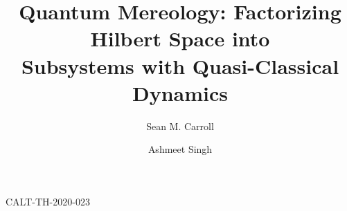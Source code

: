 \documentclass[aps,pra,onecolumn,nofootinbib,notitlepage,11pt,tightenlines]{revtex4-1}
\begin{document}
\baselineskip=14pt
\hfill CALT-TH-2020-023
\hfill

\vspace{0.5cm}
\thispagestyle{empty}



\title{Quantum Mereology: Factorizing Hilbert Space into \\ Subsystems with Quasi-Classical Dynamics}
\author{Sean M. Carroll}
\author{Ashmeet Singh}

\newcommand{\be}{\begin{equation}}
\newcommand{\ee}{\end{equation}}
\newcommand{\bea}{\begin{eqnarray}}
\newcommand{\eea}{\end{eqnarray}}
\newcommand{\hst}{\widetilde{\mathcal{H}}} 
\newcommand{\iso}{\dot{=}}
\newcommand{\tdec}{{\{\theta\}}}
\newcommand{\pdec}{{\{\phi\}}}
\newcommand{\spsi}{\ket{\psi}}
\newcommand{\psimu}{\ket{\psi^{(\mu)}}}
\newcommand{\Cmu}{\left[ C^{(\mu)} \right]}
\newcommand{\Y}{\left[ C \right]}
\newcommand{\Ymean}{\left[ \bar{C} \right]}
\newcommand{\deltaY}{\left[ \Delta C \right]}
\newcommand{\OD}{\left[ O_{D} \right]}
\newcommand{\phiM}{\left[ \Phi \right]}
\newcommand{\Dim}{\textrm{dim\,}}
\newcommand{\Tr}{\textrm{Tr\,}}
\newcommand{\hs}{\mathcal{H}} 
\newcommand{\A}{\hat{A}}
\newcommand{\B}{\hat{B}}
\newcommand{\V}{\hat{V}}
\newcommand{\D}{\hat{D}}
\newcommand{\E}{\hat{E}}
\newcommand{\Os}{\hat{O}_{S}}
\newcommand{\Oa}{\hat{O}_{A}}
\newcommand{\pos}{\hat{Q}}
\newcommand{\mom}{\hat{P}}
\newcommand{\ham}{\hat{H}}
\newcommand{\Tu}{\hat{T}_{u}}
\newcommand{\Tv}{\hat{T}_{v}}
\newcommand{\subA}{\mathcal{A}}
\newcommand{\subB}{\mathcal{B}}
\newcommand{\oprho}{\hat{\rho}}
\newcommand{\rhodot}{\dot{\hat{\rho}}_{A}}
\newcommand{\opsig}{\hat{\sigma}}
\newcommand{\Uop}{\hat{U}}
\newcommand{\intham}{\hat{H}_{\rm{int}}}
\newcommand{\selfham}{\hat{H}_{\rm{self}}}
\newcommand{\Ot}{\mathcal{O}(t)}
\newcommand{\Ottwo}{\mathcal{O}(t^2)}
\newcommand{\Otthree}{\mathcal{O}(t^3)}
\newcommand{\eye}{\hat{\mathbb{I}}}
\newcommand{\basisB}{\mathcal{B}}
\newcommand{\trace}{\mathrm{Tr}}
\newcommand{\Aa}{\hat{A}_{\alpha}}
\newcommand{\Bb}{\hat{B}_{\beta}}
\newcommand{\tp}{\otimes}
\newcommand{\lla}{\left\langle}
\newcommand{\rra}{\right\rangle}
\newcommand{\lcb}{\left[}
\newcommand{\rcb}{\right]}
\newcommand{\Oj}{\hat{O}_{j}}
\newcommand{\opphi}{\hat{\phi}}
\newcommand{\oppi}{\hat{\pi}}
\newcommand{\M}{\hat{M}}
\end{document}
